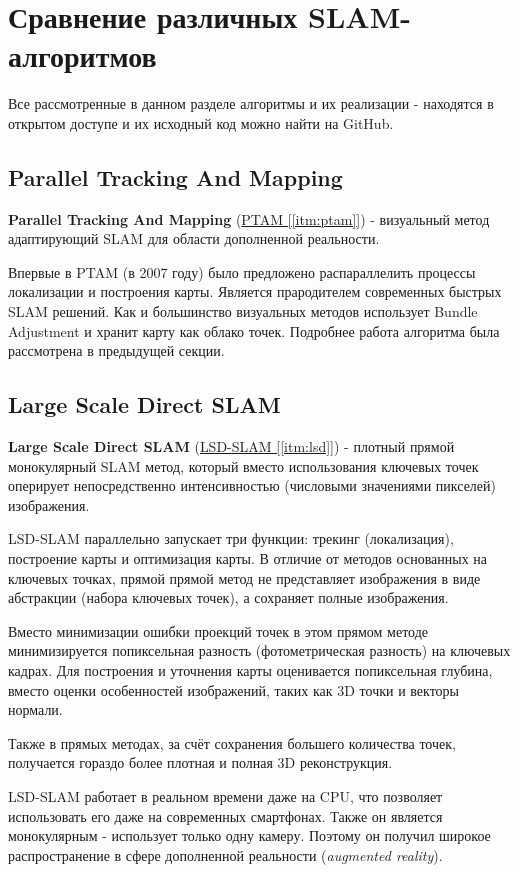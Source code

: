 \section{Сравнение различных SLAM-алгоритмов}

Все рассмотренные в данном разделе алгоритмы и их реализации - находятся в открытом доступе и их исходный код можно найти на GitHub.

\subsection{Parallel Tracking And Mapping}
\textbf{Parallel Tracking And Mapping} (\hyperref[itm:ptam]{PTAM [\ref{itm:ptam}]}) - визуальный метод адаптирующий SLAM для области дополненной реальности.

Впервые в PTAM (в 2007 году) было предложено распараллелить процессы локализации и построения карты. Является прародителем современных быстрых SLAM решений. Как и большинство визуальных методов использует Bundle Adjustment и хранит карту как облако точек. Подробнее работа алгоритма была рассмотрена в предыдущей секции.

\subsection{Large Scale Direct SLAM}
\textbf{Large Scale Direct SLAM} (\hyperref[itm:lsd]{LSD-SLAM [\ref{itm:lsd}]}) - плотный прямой монокулярный SLAM метод, который вместо использования ключевых точек оперирует непосредственно интенсивностью (числовыми значениями пикселей) изображения.

LSD-SLAM параллельно запускает три функции: трекинг (локализация), построение карты и оптимизация карты. В отличие от методов основанных на ключевых точках, прямой прямой метод не представляет изображения в виде абстракции (набора ключевых точек), а сохраняет полные изображения.

Вместо минимизации ошибки проекций точек в этом прямом методе минимизируется попиксельная разность (фотометрическая разность) на ключевых кадрах. Для построения и уточнения карты оценивается попиксельная глубина, вместо оценки особенностей изображений, таких как 3D точки и векторы нормали.

Также в прямых методах, за счёт сохранения большего количества точек, получается гораздо более плотная и полная 3D реконструкция.

LSD-SLAM работает в реальном времени даже на CPU, что позволяет использовать его даже на современных смартфонах. Также он является монокулярным - использует только одну камеру. Поэтому он получил широкое распространение в сфере дополненной реальности (\textit{augmented reality}).


